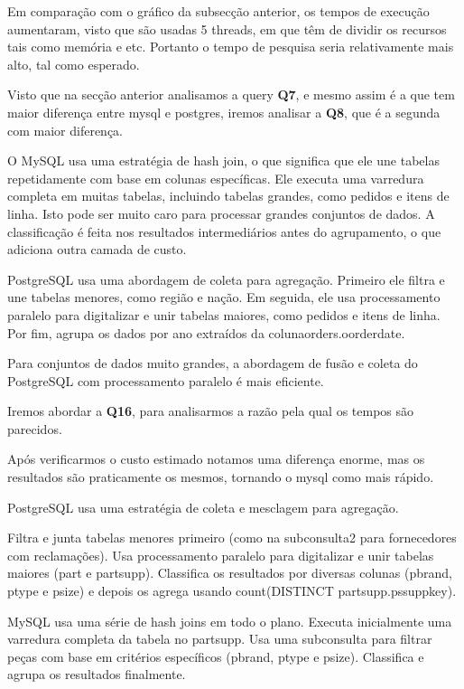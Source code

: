 \documentclass{article}
\begin{document}
Em comparação com o gráfico da subsecção anterior, os tempos de execução aumentaram,
visto que são usadas 5 threads, em que têm de dividir os recursos tais como memória e etc. Portanto
o tempo de pesquisa seria relativamente mais alto, tal como esperado.

Visto que na secção anterior analisamos a query \textbf{Q7}, e mesmo assim é a que tem maior diferença entre mysql e postgres, iremos analisar a \textbf{Q8}, que é a segunda com maior diferença.

O MySQL usa uma estratégia de hash join, o que significa que ele une tabelas repetidamente com base em colunas específicas.
Ele executa uma varredura completa em muitas tabelas, incluindo tabelas grandes, como pedidos e itens de linha.
Isto pode ser muito caro para processar grandes conjuntos de dados.
A classificação é feita nos resultados intermediários antes do agrupamento, o que adiciona outra camada de custo.


PostgreSQL usa uma abordagem de coleta para agregação.
Primeiro ele filtra e une tabelas menores, como região e nação.
Em seguida, ele usa processamento paralelo para digitalizar e unir tabelas maiores, como pedidos e itens de linha.
Por fim, agrupa os dados por ano extraídos da colunaorders.o\underline{}orderdate.

Para conjuntos de dados muito grandes, a abordagem de fusão e coleta do PostgreSQL com processamento paralelo é mais eficiente.


Iremos abordar a \textbf{Q16}, para analisarmos a razão pela qual os tempos são parecidos.

Após verificarmos o custo estimado notamos uma diferença enorme, mas os resultados são praticamente os mesmos, tornando o mysql como mais rápido.

PostgreSQL usa uma estratégia de coleta e mesclagem para agregação.

Filtra e junta tabelas menores primeiro (como na subconsulta2 para fornecedores com reclamações).
Usa processamento paralelo para digitalizar e unir tabelas maiores (part e partsupp).
Classifica os resultados por diversas colunas (p\underline{}brand, p\underline{}type e p\underline{}size) e depois os agrega usando count(DISTINCT partsupp.ps\underline{}suppkey).


MySQL usa uma série de hash joins em todo o plano.
Executa inicialmente uma varredura completa da tabela no partsupp.
Usa uma subconsulta para filtrar peças com base em critérios específicos (p\underline{}brand, p\underline{}type e p\underline{}size).
Classifica e agrupa os resultados finalmente.
\end{document}
